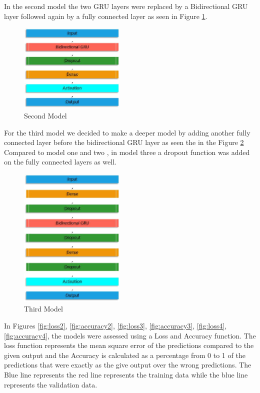 In the second model the two GRU layers were replaced by a Bidirectional GRU layer followed again by a fully connected layer as seen in Figure \ref{fig:secondModel}.
\begin{figure}[htp]
	\centering
	\includegraphics[width=0.45\textwidth]{Illustrations/Model2.jpg}
	\caption{Second Model}
	\label{fig:secondModel}
\end{figure}
\newpage
For the third model we decided to make a deeper model by adding another fully connected layer before the bidirectional GRU layer as seen the in the Figure \ref{fig:thirdModel}  Compared to model one and two , in model three a dropout function was added on the fully connected layers as well.
\begin{figure}[htp]
	\centering
	\includegraphics[width=0.45\textwidth]{Illustrations/Model3.jpg}
	\caption{Third Model}
	\label{fig:thirdModel}
\end{figure}

In Figures \ref{fig:loss2}, \ref{fig:accuracy2}, \ref{fig:loss3}, \ref{fig:accuracy3}, \ref{fig:loss4}, \ref{fig:accuracy4},
the models were assessed using a Loss and Accuracy function. 
The loss function represents the mean square error of the predictions compared to the 
given output and the Accuracy is calculated as a percentage from 0 to 1 of the predictions 
that were exactly as the give output over the wrong predictions. The Blue line represents the 
red line represents the training data while the blue line represents the validation data.

